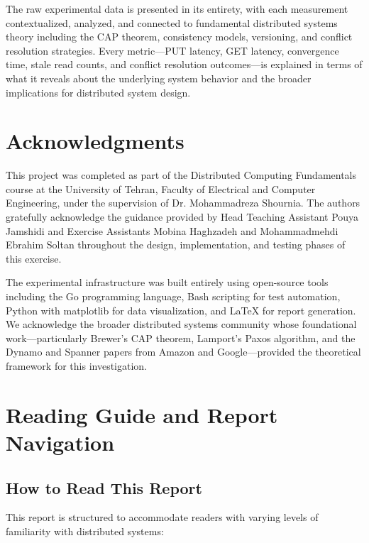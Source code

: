 \documentclass[10pt,a4paper]{article}
\begin{document}
The raw experimental data is presented in its entirety, with each measurement contextualized, analyzed, and connected to fundamental distributed systems theory including the CAP theorem, consistency models, versioning, and conflict resolution strategies. Every metric---PUT latency, GET latency, convergence time, stale read counts, and conflict resolution outcomes---is explained in terms of what it reveals about the underlying system behavior and the broader implications for distributed system design.

\newpage

\newpage
\section{Acknowledgments}

This project was completed as part of the Distributed Computing Fundamentals course at the University of Tehran, Faculty of Electrical and Computer Engineering, under the supervision of Dr. Mohammadreza Shournia. The authors gratefully acknowledge the guidance provided by Head Teaching Assistant Pouya Jamshidi and Exercise Assistants Mobina Haghzadeh and Mohammadmehdi Ebrahim Soltan throughout the design, implementation, and testing phases of this exercise.

The experimental infrastructure was built entirely using open-source tools including the Go programming language, Bash scripting for test automation, Python with matplotlib for data visualization, and LaTeX for report generation. We acknowledge the broader distributed systems community whose foundational work---particularly Brewer's CAP theorem, Lamport's Paxos algorithm, and the Dynamo and Spanner papers from Amazon and Google---provided the theoretical framework for this investigation.

\newpage
\section{Reading Guide and Report Navigation}

\subsection{How to Read This Report}

This report is structured to accommodate readers with varying levels of familiarity with distributed systems:
\end{document}
